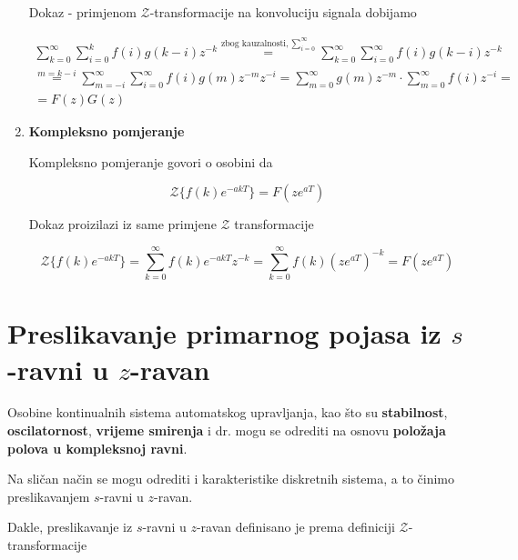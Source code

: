 \documentclass[12pt]{IEEEtran}
\numberwithin{equation}{subsection}
\numberwithin{figure}{section}
\begin{document}
\begin{enumerate}
    Dokaz - primjenom $\mathcal{Z}$-transformacije na konvoluciju signala dobijamo 

    \begin{equation}
        \begin{gathered}
            \sum_{k = 0}^{\infty}{\sum_{i = 0}^{k}{f(i)g(k - i)z^{-k}}} \stackrel{\text{zbog kauzalnosti, } \sum_{i = 0}^{\infty}}{=} \sum_{k = 0}^{\infty}{\sum_{i = 0}^{\infty}{f(i)g(k - i)z^{-k}}}\\
            \stackrel{m = k - i}{=} \sum_{m = -i}^{\infty}{\sum_{i = 0}^{\infty}{f(i)g(m)z^{-m}z^{-i}}} = \sum_{m = 0}^{\infty}{g(m)z^{-m}} \cdot \sum_{m = 0}^{\infty}{f(i)z^{-i}} =\\
            = F(z)G(z)
        \end{gathered}
    \end{equation}

    \item \textbf{Kompleksno pomjeranje}
    
    Kompleksno pomjeranje govori o osobini da 

    \begin{equation}
        \mathcal{Z}\{f(k)e^{-akT}\} = F(ze^{aT})
    \end{equation}

    Dokaz proizilazi iz same primjene $\mathcal{Z}$ transformacije

    \begin{equation}
        \mathcal{Z}\{f(k)e^{-akT}\} = \sum_{k = 0}^{\infty}{f(k)e^{-akT}z^{-k}} = \sum_{k = 0}^{\infty}{f(k)(ze^{aT})^{-k}} = F(ze^{aT})
    \end{equation}

\end{enumerate}

\newpage
\section{\textbf{Preslikavanje primarnog pojasa iz $s$-ravni u $z$-ravan}}

Osobine kontinualnih sistema automatskog upravljanja, kao \v{s}to su \textbf{stabilnost},
\textbf{oscilatornost}, \textbf{vrijeme smirenja} i dr. mogu se odrediti na osnovu \textbf{polo\v{z}aja 
polova u kompleksnoj ravni}. 

Na sli\v{c}an na\v{c}in se mogu odrediti i karakteristike diskretnih sistema, a to 
\v{c}inimo preslikavanjem $s$-ravni u $z$-ravan.

Dakle, preslikavanje iz $s$-ravni u $z$-ravan definisano je prema 
definiciji $\mathcal{Z}$-transformacije 
\end{document}
